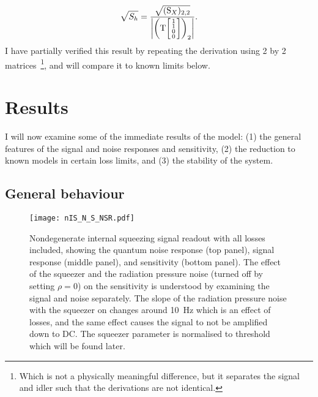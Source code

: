 \begin{equation}\label{eq:nIS_sigRO_sens}
\sqrt{S_h} = \frac{\sqrt{(\text{S}_X)_{2,2}}}{\abs{\left(\text{T}\begin{bsmallmatrix}1 \\1\\0\\0\end{bsmallmatrix}\right)_2}}.
\end{equation}
 I have partially verified this result by repeating the derivation using 2 by 2 matrices~\footnote{Which is not a physically meaningful difference, but it separates the signal and idler such that the derivations are not identical.}, and will compare it to known limits below. %


\section{Results}
\label{sec:nIS_sigRO_results}


I will now examine some of the immediate results of the model: (1) the general features of the signal and noise responses and sensitivity, (2) the reduction to known models in certain loss limits, and (3) the stability of the system.

\subsection{General behaviour}
\label{sec:nIS_general_behaviour}

\begin{figure}
	\centering
	\texttt{[image: nIS\_N\_S\_NSR.pdf]}
	\caption{  Nondegenerate internal squeezing signal readout with all losses included, showing the quantum noise response (top panel), signal response (middle panel), and sensitivity (bottom panel). The effect of the squeezer and the radiation pressure noise (turned off by setting $\rho=0$) on the sensitivity is understood by examining the signal and noise separately. The slope of the radiation pressure noise with the squeezer on changes around 10~Hz which is an effect of losses, and the same effect causes the signal to not be amplified down to DC. The squeezer parameter is normalised to threshold which will be found later.}
	\label{fig:nIS_general_sens}
\end{figure}

